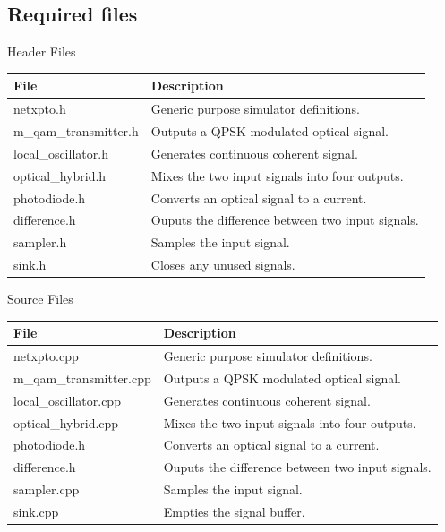 \subsection*{Required files}\label{Required files}

Header Files
\begin{table}[H]
\centering
\begin{tabulary}{1.0\textwidth}{|L|L|}
\hline
\textbf{File}           & \textbf{Description}\\
\hline
netxpto.h               & Generic purpose simulator definitions.\\
\hline
m\_qam\_transmitter.h   & Outputs a QPSK modulated optical signal.\\
\hline
local\_oscillator.h     & Generates continuous coherent signal.\\
\hline
optical\_hybrid.h       & Mixes the two input signals into four outputs.\\
\hline
photodiode.h            & Converts an optical signal to a current.\\
\hline
difference.h            & Ouputs the difference between two input signals.\\
\hline
sampler.h               & Samples the input signal.\\
\hline
sink.h                  & Closes any unused signals.\\
\hline
\end{tabulary}
\end{table}
%
%
Source Files
\begin{table}[H]
\centering
\begin{tabulary}{1.0\textwidth}{|L|L|}
\hline
\textbf{File}                   & \textbf{Description}\\
\hline
netxpto.cpp                     & Generic purpose simulator definitions.\\
\hline
m\_qam\_transmitter.cpp         & Outputs a QPSK modulated optical signal.\\
\hline
local\_oscillator.cpp           & Generates continuous coherent signal.\\
\hline
optical\_hybrid.cpp             & Mixes the two input signals into four outputs.\\
\hline
photodiode.h                    & Converts an optical signal to a current.\\
\hline
difference.h                    & Ouputs the difference between two input signals.\\
\hline
sampler.cpp                     & Samples the input signal.\\
\hline
sink.cpp                        & Empties the signal buffer.\\
\hline
\end{tabulary}
\end{table}


